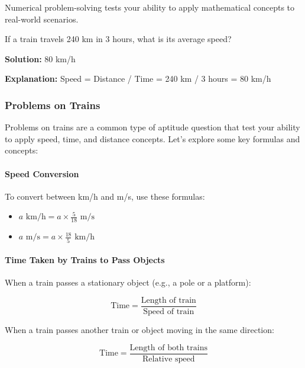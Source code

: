 Numerical problem-solving tests your ability to apply mathematical
concepts to real-world scenarios.

\begin{example}
If a train travels 240 km in 3 hours, what is its average speed?

\textbf{Solution:} 80 km/h

\textbf{Explanation:} Speed = Distance / Time = 240 km / 3 hours = 80 km/h
\end{example}

\subsubsection{Problems on Trains}

Problems on trains are a common type of aptitude question that test your
ability to apply speed, time, and distance concepts. Let's explore some
key formulas and concepts:

\paragraph{Speed Conversion}

To convert between km/h and m/s, use these formulas:

\begin{itemize}
    \item $a \text{ km/h} = a \times \frac{5}{18} \text{ m/s}$
    \item $a \text{ m/s} = a \times \frac{18}{5} \text{ km/h}$
\end{itemize}

\paragraph{Time Taken by Trains to Pass Objects}

When a train passes a stationary object (e.g., a pole or a platform):

\begin{equation}
    \text{Time} = \frac{\text{Length of train}}{\text{Speed of train}}
\end{equation}

When a train passes another train or object moving in the same
direction:

\begin{equation}
    \text{Time} = \frac{\text{Length of both trains}}{\text{Relative speed}}
\end{equation}

